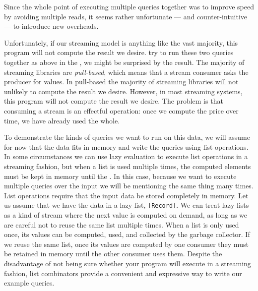 



Since the whole point of executing multiple queries together was to improve speed by avoiding multiple reads, it seems rather unfortunate --- and counter-intuitive --- to introduce new overheads.


\iffalse

Unfortunately, if our streaming model is anything like the vast majority, this program will not compute the result we desire.
try to run these two queries together as above in the , we might be surprised by the result.
The majority of streaming libraries are \emph{pull-based}, which means that a stream consumer asks the producer for values.
In pull-based
the majority of streaming libraries will not unlikely to compute the result we desire.
However, in most streaming systems, this program will not compute the result we desire.
The problem is that consuming a stream is an effectful operation: once we compute the price over time, we have already used the whole.


To demonstrate the kinds of queries we want to run on this data, we will assume for now that the data fits in memory and write the queries using list operations.
In some circumstances we can use lazy evaluation to execute list operations in a streaming fashion, but when a list is used multiple times, the computed elements must be kept in memory until the .
In this case, because we want to execute multiple queries over the input we will be mentioning the same thing many times.
List operations require that the input data be stored completely in memory.
Let us assume that we have the data in a lazy list, \lstinline/[Record]/.
We can treat lazy lists as a kind of stream where the next value is computed on demand, as long as we are careful not to reuse the same list multiple times.
When a list is only used once, its values can be computed, used, and collected by the garbage collector.
If we reuse the same list, once its values are computed by one consumer they must be retained in memory until the other consumer uses them.
Despite the disadvantage of not being sure whether your program will execute in a streaming fashion, list combinators provide a convenient and expressive way to write our example queries.

